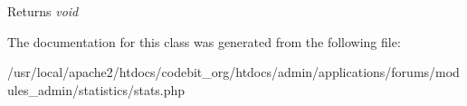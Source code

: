 \begin{DoxyReturn}{Returns}
{\itshape void} 
\end{DoxyReturn}


The documentation for this class was generated from the following file\-:\begin{DoxyCompactItemize}
\item 
/usr/local/apache2/htdocs/codebit\-\_\-org/htdocs/admin/applications/forums/modules\-\_\-admin/statistics/stats.\-php\end{DoxyCompactItemize}
